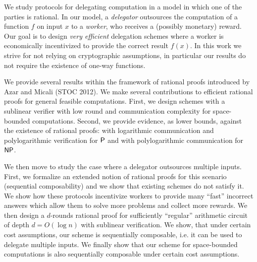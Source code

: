 % 
% 
%
	\noindent
	
	We  study protocols for delegating computation in a model in which one of the parties is rational. In our model, a \textit{delegator} outsources the computation of a function $f$ on input $x$ to a \textit{worker}, who
	receives a (possibly monetary) reward. Our goal is to design \textit{very efficient} delegation schemes 
	where a worker is economically incentivized to provide the correct result
	$f(x)$. In this work we strive for not relying on cryptographic assumptions, in particular our results do not require the existence of one-way functions. 
	
	We provide several results within the framework of rational proofs introduced by Azar and Micali (STOC 2012).
	We make several contributions to efficient rational proofs for general feasible computations.
	First, we design schemes with a sublinear verifier with low round and communication complexity for
	space-bounded computations.
	Second, we provide evidence, as lower bounds, against the existence of rational proofs:
	with logarithmic communication and polylogarithmic verification for $\P$ and 
	with polylogarithmic communication for $\NP$.
	
	We then move to study the case where a delegator outsources multiple inputs.
	First, we formalize an extended notion of rational proofs for this scenario (sequential composability) and we
	show that existing schemes do not satisfy it. We show how these protocols incentivize workers
	to provide many ``fast'' incorrect answers which allow them to solve more problems and collect more rewards.
	We then design a $d$-rounds rational proof for sufficiently ``regular'' arithmetic circuit of depth $d = O(\log{n})$
	with sublinear verification. We show, that under certain cost assumptions, our scheme is sequentially composable,
	i.e. it can be used to delegate multiple inputs. We finally show that our scheme for space-bounded computations is also 
	sequentially composable under certain cost assumptions.
	
